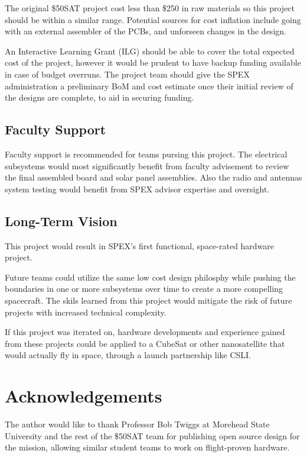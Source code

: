 \documentclass[conference]{IEEEtran} %
\begin{document}
The original \$50SAT project cost less than \$250 in raw materials so this project should be within a similar range.
Potential sources for cost inflation include going with an external assembler of the PCBs, and unforseen changes in the design.

An Interactive Learning Grant (ILG) should be able to cover the total expected cost of the project, however it would be prudent to have backup funding available in case of budget overruns.
The project team should give the SPEX administration a preliminary BoM and cost estimate once their initial review of the designs are complete, to aid in securing funding.

\subsection{Faculty Support}
Faculty support is recommended for teams pursing this project.
The electrical subsystems would most significantly benefit from faculty advisement to review the final assembled board and solar panel assemblies.
Also the radio and antennas system testing would benefit from SPEX advisor expertise and oversight.

\subsection{Long-Term Vision}
\label{sec:vision}
This project would result in SPEX's first functional, space-rated hardware project.

Future teams could utilize the same low cost design philosphy while pushing the boundaries in one or more subsystems over time to create a more compelling spacecraft.
The skils learned from this project would mitigate the risk of future projects with increased technical complexity.

If this project was iterated on, hardware developments and experience gained from these projects could be applied to a CubeSat or other nanosatellite that would actually fly in space, through a launch partnership like CSLI.\@

\section*{Acknowledgements}
The author would like to thank Professor Bob Twiggs at Morehead State University and the rest of the \$50SAT team for publishing open source design for the mission, allowing similar student teams to work on flight-proven hardware.
\end{document}
